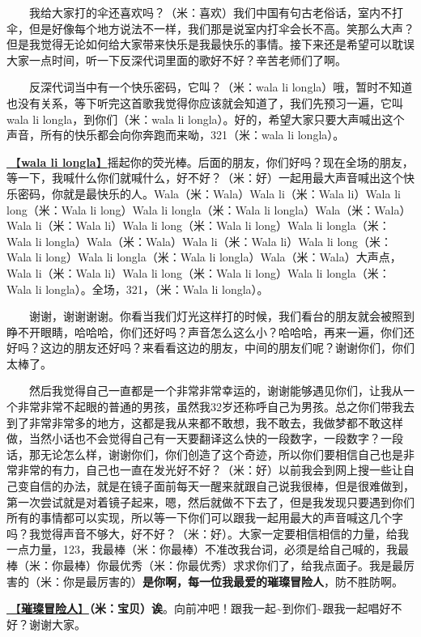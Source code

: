 \documentclass[]{ctexbook}
\begin{document}
  我给大家打的伞还喜欢吗？（米：喜欢）我们中国有句古老俗话，室内不打伞，但是好像每个地方说法不一样，我们那是说室内打伞会长不高。笑那么大声？但是我觉得无论如何给大家带来快乐是我最快乐的事情。接下来还是希望可以耽误大家一点时间，听一下反深代词里面的歌好不好？辛苦老师们了啊。

  反深代词当中有一个快乐密码，它叫？（米：wala li longla）哦，暂时不知道也没有关系，等下听完这首歌我觉得你应该就会知道了，我们先预习一遍，它叫wala li longla，到你们（米：wala li longla）。好的，希望大家只要大声喊出这个声音，所有的快乐都会向你奔跑而来呦，321（米：wala li longla）。

\hyperref[wala-li-longla]{🎵【\textbf{wala li longla}】}摇起你的荧光棒。后面的朋友，你们好吗？现在全场的朋友，等一下，我喊什么你们就喊什么，好不好？（米：好）一起用最大声音喊出这个快乐密码，你就是最快乐的人。Wala（米：Wala）Wala li（米：Wala li）Wala li long（米：Wala li long）Wala li longla（米：Wala li longla）Wala（米：Wala）Wala li（米：Wala li）Wala li long（米：Wala li long）Wala li longla（米：Wala li longla）Wala（米：Wala）Wala li（米：Wala li）Wala li long（米：Wala li long）Wala li longla（米：Wala li longla）Wala（米：Wala）大声点，Wala li（米：Wala li）Wala li long（米：Wala li long）Wala li longla（米：Wala li longla）。全场，321，（米：Wala li longla）。

  谢谢，谢谢谢谢。你看当我们灯光这样打的时候，我们看台的朋友就会被照到睁不开眼睛，哈哈哈，你们还好吗？声音怎么这么小？哈哈哈，再来一遍，你们还好吗？这边的朋友还好吗？来看看这边的朋友，中间的朋友们呢？谢谢你们，你们太棒了。

  然后我觉得自己一直都是一个非常非常幸运的，谢谢能够遇见你们，让我从一个非常非常不起眼的普通的男孩，虽然我32岁还称呼自己为男孩。总之你们带我去到了非常非常多的地方，这都是我从来都不敢想，我不敢去，我做梦都不敢这样做，当然小话也不会觉得自己有一天要翻译这么快的一段数字，一段数字？一段话，那无论怎么样，谢谢你们，你们创造了这个奇迹，所以你们要相信自己也是非常非常的有力，自己也一直在发光好不好？（米：好）以前我会到网上搜一些让自己变自信的办法，就是在镜子面前每天一醒来就跟自己说我很棒，但是很难做到，第一次尝试就是对着镜子起来，嗯，然后就做不下去了，但是我发现只要遇到你们所有的事情都可以实现，所以等一下你们可以跟我一起用最大的声音喊这几个字吗？我觉得声音不够大，好不好？（米：好）。大家一定要相信相信的力量，给我一点力量，123，我最棒（米：你最棒）不准改我台词，必须是给自己喊的，我最棒（米：你最棒）你最优秀（米：你最优秀）求求你们了，给我点面子。我是最厉害的（米：你是最厉害的）\textbf{是你啊，每一位我最爱的璀璨冒险人}，防不胜防啊。

\hyperref[adventurers]{🎵【\textbf{璀璨冒险人}】}\textbf{（米：宝贝）诶}。向前冲吧！跟我一起\textasciitilde 到你们\textasciitilde 跟我一起唱好不好？谢谢大家。
\end{document}
